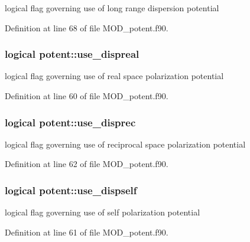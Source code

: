 logical flag governing use of long range dispersion potential 



Definition at line 68 of file M\-O\-D\-\_\-potent.\-f90.

\hypertarget{classpotent_a426f1334f3ae39238baec57dd741390c}{
\subsubsection[{use\-\_\-dispreal}]{\setlength{\rightskip}{0pt plus 5cm}logical potent\-::use\-\_\-dispreal}}\label{classpotent_a426f1334f3ae39238baec57dd741390c}


logical flag governing use of real space polarization potential 



Definition at line 60 of file M\-O\-D\-\_\-potent.\-f90.

\hypertarget{classpotent_a54fc293e78c17bbe7755967bbc392b40}{
\subsubsection[{use\-\_\-disprec}]{\setlength{\rightskip}{0pt plus 5cm}logical potent\-::use\-\_\-disprec}}\label{classpotent_a54fc293e78c17bbe7755967bbc392b40}


logical flag governing use of reciprocal space polarization potential 



Definition at line 62 of file M\-O\-D\-\_\-potent.\-f90.

\hypertarget{classpotent_a920b5aeadf8360f86eaad6ba489ad8f6}{
\subsubsection[{use\-\_\-dispself}]{\setlength{\rightskip}{0pt plus 5cm}logical potent\-::use\-\_\-dispself}}\label{classpotent_a920b5aeadf8360f86eaad6ba489ad8f6}


logical flag governing use of self polarization potential 



Definition at line 61 of file M\-O\-D\-\_\-potent.\-f90.

